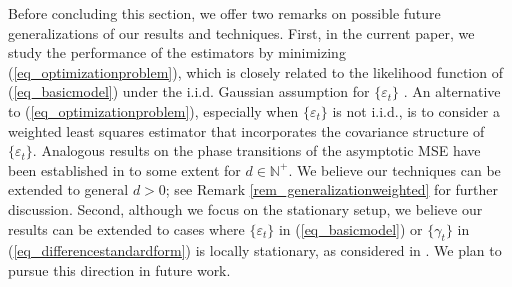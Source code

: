 \documentclass[11pt]{article}
\numberwithin{equation}{section}
\numberwithin{figure}{section}
\begin{document}
%
Before concluding this section, we offer two remarks on possible future generalizations of our results and techniques. First, in the current paper, we study the performance of the estimators by minimizing (\ref{eq_optimizationproblem}), which is closely related to the likelihood function of (\ref{eq_basicmodel}) under the i.i.d. Gaussian assumption for $\{\varepsilon_t\}$ \cite{hang2006estimation}. An alternative to (\ref{eq_optimizationproblem}), especially when $\{\varepsilon_t\}$ is not i.i.d., is to consider a weighted least squares estimator that incorporates the covariance structure of $\{\varepsilon_t\}$. Analogous results on the phase transitions of the asymptotic MSE have been established in \cite{burman_shumway2009estimation} to some extent for $d \in \mathbb{N}^+$. We believe our techniques can be extended to general $d > 0$; see Remark \ref{rem_generalizationweighted} for further discussion. Second, although we focus on the stationary setup, we believe our results can be extended to cases where $\{\varepsilon_t\}$ in (\ref{eq_basicmodel}) or $\{\gamma_t\}$ in (\ref{eq_differencestandardform}) is locally stationary, as considered in \cite{ding2023autoregressive,ding_zhou2025pacf}. We plan to pursue this direction in future work.
\end{document}
